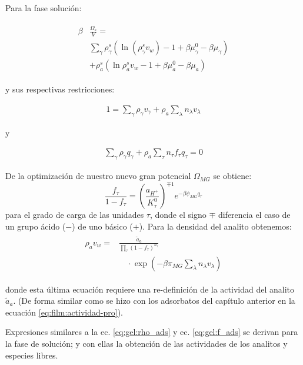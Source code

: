 Para la fase soluci\'on:

\begin{align}
	\begin{aligned}
		\beta&\frac{\Omega_s}{V}=\\& \sum_{\gamma   } {\rho^s_\gamma\left(\ln(\rho_\gamma^sv_w) -1 + \beta\mu_\gamma^0 - \beta\mu_\gamma\right)} \\
		& + \rho^s_a \left( \ln \rho^s_a v_w -1 +\beta\mu^0_a - \beta\mu_a\right)
	\end{aligned}
	\label{eq:gel:bulk-total}
\end{align}

y sus respectivas restricciones:

\begin{align}
	1 = \sum_{\gamma } \rho_\gamma v_\gamma  + \rho_a \sum_\lambda n_\lambda v_\lambda
\end{align}

y 

\begin{align}
	\sum_\gamma \rho_\gamma q_\gamma + \rho_a \sum_\tau n_\tau f_\tau q_\tau = 0
	\label{eq:gel:bulk-neu-total}
\end{align}



De la optimizaci\'on de nuestro nuevo gran potencial $\Omega_{MG}$  se obtiene:
%
\begin{equation}
\frac{f_\tau}{1-f_\tau}=\left(\frac{a_{H^+}}{K^0_\tau}\right)^{\mp 1} e^{-\beta \psi_{MG} q_\tau}
\label{eq:gel:f_ads}
\end{equation}
%
\noindent para el grado de carga de las unidades $\tau$, donde el signo $\mp$ diferencia el caso de un grupo \'acido ($-$) de uno b\'asico ($+$).
Para la densidad del analito obtenemos:
%
\begin{align}
    \begin{aligned}
   \rho_a v_w =&\frac{ \tilde{a}_a}{\prod_\tau \left(1-f_\tau\right)^{n_\tau}}\\
&\quad \cdot\exp{\left(-\beta \pi_{MG} \sum_\lambda n_\lambda v_\lambda \right)} 
	\label{eq:gel:rho_ads}
    \end{aligned}
\end{align}
%

\noindent donde esta \'ultima ecuaci\'on requiere una re-definici\'on de la actividad del analito $\tilde{a}_a$. (De forma similar como se hizo con los adsorbatos del cap\'itulo anterior en la ecuaci\'on \ref{eq:film:actividad-pro}).

Expresiones similares a la ec. \ref{eq:gel:rho_ads} y ec. \ref{eq:gel:f_ads} se derivan para la fase de soluci\'on; y con ellas la obtenci\'on de las actividades  de los analitos y especies libres. 



